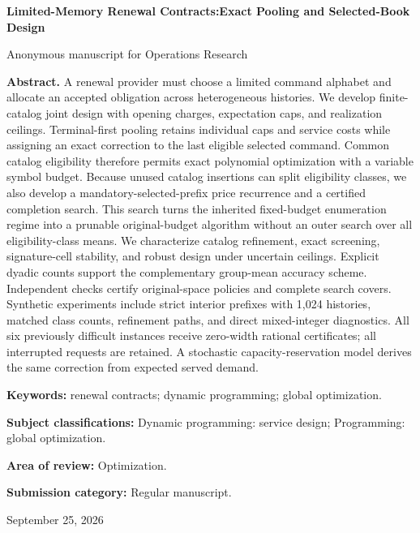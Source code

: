 \documentclass[11pt,letterpaper]{article}
\theoremstyle{definition}\newtheorem{assumption}[theorem]{Assumption}
\begin{document}
\hypersetup{pageanchor=false}
\begin{titlepage}\centering
{\Large\bfseries Limited-Memory Renewal Contracts:\newline Exact Pooling and Selected-Book Design\par}
\vspace{.3in}Anonymous manuscript for Operations Research\par\vspace{.2in}
\begin{minipage}{\textwidth}\textbf{Abstract.} A renewal provider must choose a limited command alphabet and allocate an accepted obligation across heterogeneous histories. We develop finite-catalog joint design with opening charges, expectation caps, and realization ceilings. Terminal-first pooling retains individual caps and service costs while assigning an exact correction to the last eligible selected command. Common catalog eligibility therefore permits exact polynomial optimization with a variable symbol budget. Because unused catalog insertions can split eligibility classes, we also develop a mandatory-selected-prefix price recurrence and a certified completion search. This search turns the inherited fixed-budget enumeration regime into a prunable original-budget algorithm without an outer search over all eligibility-class means. We characterize catalog refinement, exact screening, signature-cell stability, and robust design under uncertain ceilings. Explicit dyadic counts support the complementary group-mean accuracy scheme. Independent checks certify original-space policies and complete search covers. Synthetic experiments include strict interior prefixes with 1,024 histories, matched class counts, refinement paths, and direct mixed-integer diagnostics. All six previously difficult instances receive zero-width rational certificates; all interrupted requests are retained. A stochastic capacity-reservation model derives the same correction from expected served demand.
\par\vspace{.15in}\textbf{Keywords:} renewal contracts; dynamic programming; global optimization.
\par\vspace{.1in}\textbf{Subject classifications:} Dynamic programming: service design; Programming: global optimization.
\par\vspace{.1in}\textbf{Area of review:} Optimization.
\par\vspace{.1in}\textbf{Submission category:} Regular manuscript.
\end{minipage}\vfill September 25, 2026\end{titlepage}
\end{document}
